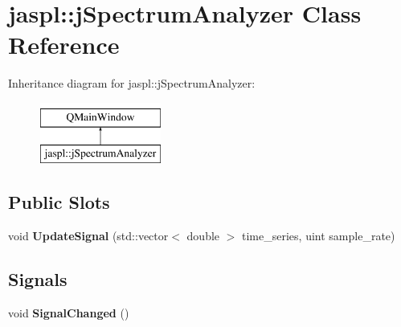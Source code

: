 \hypertarget{classjaspl_1_1j_spectrum_analyzer}{}\section{jaspl\+:\+:j\+Spectrum\+Analyzer Class Reference}
\label{classjaspl_1_1j_spectrum_analyzer}
Inheritance diagram for jaspl\+:\+:j\+Spectrum\+Analyzer\+:\begin{figure}[H]
\begin{center}
\leavevmode
\includegraphics[height=2.000000cm]{classjaspl_1_1j_spectrum_analyzer}
\end{center}
\end{figure}
\subsection*{Public Slots}
\begin{DoxyCompactItemize}
\item 
void {\bfseries Update\+Signal} (std\+::vector$<$ double $>$ time\+\_\+series, uint sample\+\_\+rate)\hypertarget{classjaspl_1_1j_spectrum_analyzer_a0724baa59176c7e8a0050f52472f578f}{}\label{classjaspl_1_1j_spectrum_analyzer_a0724baa59176c7e8a0050f52472f578f}

\end{DoxyCompactItemize}
\subsection*{Signals}
\begin{DoxyCompactItemize}
\item 
void {\bfseries Signal\+Changed} ()\hypertarget{classjaspl_1_1j_spectrum_analyzer_a9c5cf1221b35e6392fff8bf418edcedd}{}\label{classjaspl_1_1j_spectrum_analyzer_a9c5cf1221b35e6392fff8bf418edcedd}

\end{DoxyCompactItemize}
